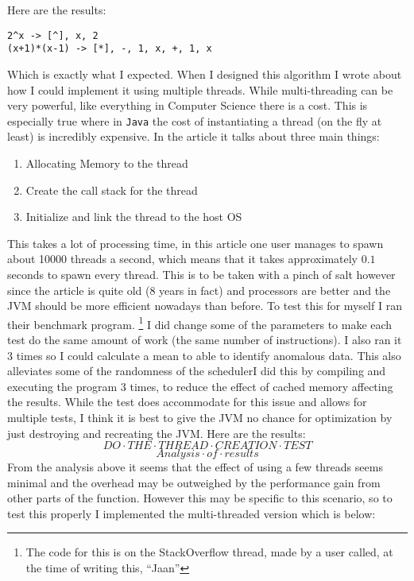 \documentclass[../../../../../main.tex]{subfiles}
\begin{document}
Here are the results:
\begin{verbatim}
2^x -> [^], x, 2
(x+1)*(x-1) -> [*], -, 1, x, +, 1, x
\end{verbatim}
Which is exactly what I expected.
\newpage \noindent
When I designed this algorithm I wrote about how I could implement it using multiple threads. While multi-threading can be very powerful, like everything in Computer Science there is a cost. This is especially true where in \texttt{Java} the cost of instantiating a thread\cite{threadCreationJava} (on the fly at least) is incredibly expensive. In the article it talks about three main things:
\begin{enumerate}
\item Allocating Memory to the thread
\item Create the call stack for the thread\cite{threadStackJava, callStack}
\item Initialize and link the thread to the host OS
\end{enumerate}
This takes a lot of processing time, in this article\cite{threadCreationRate} one user manages to spawn about 10000 threads a second, which means that it takes approximately $0.1$ seconds to spawn every thread. This is to be taken with a pinch of salt however since the article is quite old (8 years in fact) and processors are better and the JVM should be more efficient nowadays than before. To test this for myself I ran their benchmark program.
\footnote{The code for this is on the StackOverflow thread, made by a user called, at the time of writing this, ``Jaan''\cite{threadCreationRate}} 
I did change some of the parameters to make each test do the same amount of work (the same number of instructions). I also ran it 3 times so I could calculate a mean to able to identify anomalous data. This also alleviates some of the randomness of the schedulerI did this by compiling and executing the program 3 times, to reduce the effect of cached memory affecting the results. While the test does accommodate for this issue and allows for multiple tests, I think it is best to give the JVM no chance for optimization by just destroying and recreating the JVM. Here are the results:
\[DO \cdot THE \cdot THREAD \cdot CREATION \cdot TEST\]
\[Analysis\cdot of\cdot results\]
\newpage\noindent
From the analysis above it seems that the effect of using a few threads seems minimal and the overhead may be outweighed by the performance gain from other parts of the function. However this may be specific to this scenario, so to test this properly I implemented the multi-threaded version which is below:
\end{document}

